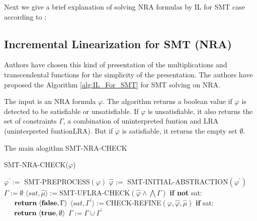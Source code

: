 \noindent Next we give a brief explanation of solving NRA formulas by IL for SMT case according to \cite{Cimatti:2018:ILS:3274693.3230639}:
\subsection{Incremental Linearization for SMT (NRA)}
\label{subsec:IL_For_SMT}
Authors have chosen this kind of presentation of the multiplications and transcendental functions for the simplicity of the presentation.
The authors have proposed the Algorithm \ref{alg:IL_For_SMT} for SMT solving on NRA.\newline

\noindent The input is an NRA formula $\varphi$.
The algorithm returns a boolean value if $\varphi$ is detected to be satisfiable or unsatisfiable.
If $\varphi$ is unsatisfiable, it also returns the set of constraints $\Gamma$, a combination of uninterpreted funtion and LRA (uninterpreted funtionLRA).
But if $\varphi$ is satisfiable, it returns the empty set $\emptyset$.\newline

\begin{algorithm}
\caption{The main alogithm SMT-NRA-CHECK \cite{Cimatti:2018:ILS:3274693.3230639}} 
\label{alg:IL_For_SMT}
SMT-NRA-CHECK($\varphi$)
\begin{algorithmic}[1]
\State $\varphi^\prime :=$ SMT-PREPROCESS$(\varphi)$
\State $\hat{\varphi} :=$ SMT-INITIAL-ABSTRACTION$(\varphi^\prime)$
\State $\Gamma := \emptyset$
\State $\langle sat, \hat{\mu} \rangle := $SMT-UFLRA-CHECK$(\hat{\varphi} \wedge \bigwedge \Gamma)$
\State \textbf{if not} sat:
\State $\hspace{5mm} \textbf{return} \hspace{1mm}\langle \textbf{false}, \Gamma \rangle$
\State $\langle sat, \Gamma^\prime \rangle := $CHECK-REFINE$(\varphi, \hat{\varphi}, \hat{\mu})$
\State \textbf{if} sat:
\State $\hspace{5mm} \textbf{return} \hspace{1mm}\langle \textbf{true}, \emptyset \rangle$
\State $\Gamma := \Gamma \cup \Gamma^\prime$
\EndWhile
\end{algorithmic}
\end{algorithm}


